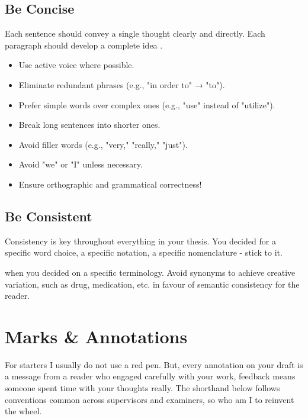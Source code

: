 \documentclass{../sharedAssets/tufte}
\begin{document}
\section{Be Concise}
Each sentence should convey a single thought clearly and directly. Each paragraph should develop a complete idea \cite{FreiburgThesisGuideline2025}.

  \begin{itemize}
    \item Use active voice where possible.
    \item Eliminate redundant phrases (e.g., "in order to" → "to").
    \item Prefer simple words over complex ones (e.g., "use" instead of "utilize").
    \item Break long sentences into shorter ones.
    \item Avoid filler words (e.g., "very," "really," "just").
    \item Avoid "we" or "I" unless necessary.
    \item Ensure orthographic and grammatical correctness!
  \end{itemize}


\section{Be Consistent}
Consistency is key throughout everything in your thesis. You decided for a specific word choice, a specific notation, a specific nomenclature - stick to it.

 when you decided on a specific terminology. Avoid synonyms to achieve creative variation, such as drug, medication, etc. in favour
of semantic consistency for the reader.








\chapter{Marks \& Annotations}

For starters I usually do not use a red pen. But, every annotation on your draft is a message from a reader who engaged 
carefully with your work, feedback means someone spent time with your thoughts really.
The shorthand below follows conventions common across supervisors and examiners, so who am I to reinvent the wheel.
\end{document}
